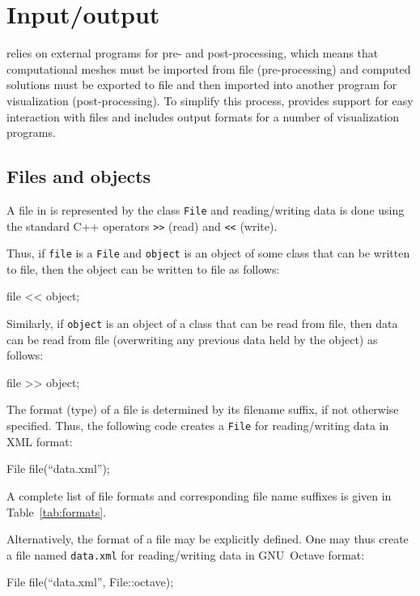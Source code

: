 \chapter{Input/output}
\label{chapter:io}

\dolfin{} relies on external programs for pre- and post-processing,
which means that computational meshes must be imported from file
(pre-processing) and computed solutions must be exported to file and
then imported into another program for visualization
(post-processing). To simplify this process, \dolfin{} provides
support for easy interaction with files and includes output formats
for a number of visualization programs.

\section{Files and objects}

A file in \dolfin{} is represented by the class \texttt{File} and
reading/writing data is done using the standard C++ operators
\texttt{>>} (read) and \texttt{<<} (write).

Thus, if \texttt{file} is a \texttt{File} and \texttt{object} is an
object of some class that can be written to file, then the object can
be written to file as follows:
\begin{code}
  file << object;
\end{code}
Similarly, if \texttt{object} is an object of a class that can be read
from file, then data can be read from file (overwriting any previous
data held by the object) as follows:
\begin{code}
  file >> object;
\end{code}

The format (type) of a file is determined by its filename suffix, if
not otherwise specified. Thus, the following code creates a
\texttt{File} for reading/writing data in \dolfin{} XML format:
\begin{code}
  File file(``data.xml'');
\end{code}
A complete list of file formats and corresponding file name suffixes
is given in Table~\ref{tab:formats}.

Alternatively, the format of a file may be explicitly defined. One may
thus create a file named \texttt{data.xml} for reading/writing data in
GNU~Octave format:
\begin{code}
  File file(``data.xml'', File::octave);
\end{code}


